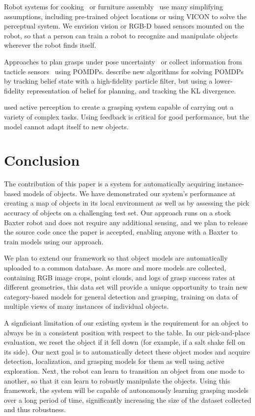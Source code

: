 \documentclass[graybox]{svmult}
\begin{document}
Robot systems for cooking~\citep{bollini12, beetz11} or furniture
assembly~\citep{knepper13} use many simplifying assumptions, including
pre-trained object locations or using VICON to solve the perceptual
system.  We envision vision or RGB-D based sensors mounted on the
robot, so that a person can train a robot to recognize and manipulate
objects wherever the robot finds itself.

Approaches to plan grasps under pose uncertainty~\citep{stulp11} or
collect information from tacticle sensors~\citep{hsiao10} using
POMDPs.  \citet{plat11} describe new algorithms for solving POMDPs by
tracking belief state with a high-fidelity particle filter, but using
a lower-fidelity representation of belief for planning, and tracking
the KL divergence.

\citet{hudson12} used active perception to create a grasping system
capable of carrying out a variety of complex tasks.  Using feedback is
critical for good performance, but the model cannot adapt itself to
new objects.

\section{Conclusion}

The contribution of this paper is a system for automatically acquiring
instance-based models of objects.  We have demonstrated our system's
performance at creating a map of objects in its local environment as
well as by assessing the pick accuracy of objects on a challenging
test set.  Our approach runs on a stock Baxter robot and does not
require any additional sensing, and we plan to release the source code
once the paper is accepted, enabling anyone with a Baxter to train
models using our approach.

We plan to extend our framework so that object models are
automatically uploaded to a common database.  As more and more models
are collected, containing RGB image crops, point clouds, and logs of
grasp success rates at different geometries, this data set will
provide a unique opportunity to train new category-based models for
general detection and grasping, training on data of multiple views of
many instances of individual objects.

A signficiant limitation of our existing system is the requirement for
an object to always be in a consistent position with respect to the
table.  In our pick-and-place evaluation, we reset the object if it
fell down (for example, if a salt shake fell on its side).  Our next
goal is to automatically detect these object modes and acquire
detection, localization, and grasping models for them as well using
active exploration.  Next, the robot can learn to transition an object
from one mode to another, so that it can learn to robustly manipulate
the objects.  Using this framework, the system will be capable of
autonomously learning grasping models over a long period of time,
significantly increasing the size of the dataset collected and thus
robustness.



\end{document}
